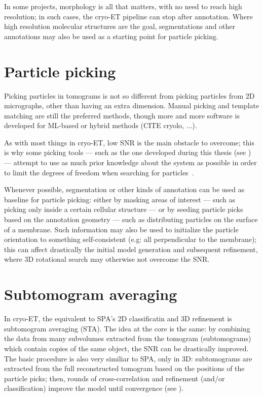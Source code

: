 In some projects, morphology is all that matters, with no need to reach high resolution; in such cases, the cryo-ET pipeline can stop after annotation.
Where high resolution molecular structures are the goal, segmentations and other annotations may also be used as a starting point for particle picking.

\section{Particle picking}\label{et_particle_picking}
Picking particles in tomograms is not so different from picking particles from 2D micrographs, other than having an extra dimension.
Manual picking and template matching are still the preferred methods, though more and more software is developed for ML-based or hybrid methods (CITE cryolo, ...).

As with most things in cryo-ET, low SNR is the main obstacle to overcome; this is why some picking tools --- such as the one developed during this thesis (see ) --- attempt to use as much prior knowledge about the system as possible in order to limit the degrees of freedom when searching for particles~\cite{castano-diezDynamoCatalogueGeometrical2017,wagnerEvolutionSPHIREcrYOLOParticle2020,gaifasBlikExtensible3D2024}.

Whenever possible, segmentation or other kinds of annotation can be used as baseline for particle picking: either by masking areas of interest --- such as picking only inside a certain cellular structure --- or by seeding particle picks based on the annotation geometry --- such as distributing particles on the surface of a membrane.
Such information may also be used to initialize the particle orientation to something self-consistent (e.g: all perpendicular to the membrane); this can affect drastically the initial model generation and subsequent refinement, where 3D rotational search may otherwise not overcome the SNR.

\section{Subtomogram averaging}\label{et_sta}
In cryo-ET, the equivalent to SPA's 2D classificatin and 3D refinement is subtomogram averaging (STA).
The idea at the core is the same: by combining the data from many subvolumes extracted from the tomogram (subtomograms) which contain copies of the same object, the SNR can be drastically improved.
The basic procedure is also very similiar to SPA, only in 3D: subtomograms are extracted from the full reconstructed tomogram based on the positions of the particle picks; then, rounds of cross-correlation and refinement (and/or classification) improve the model until convergence (see ).

